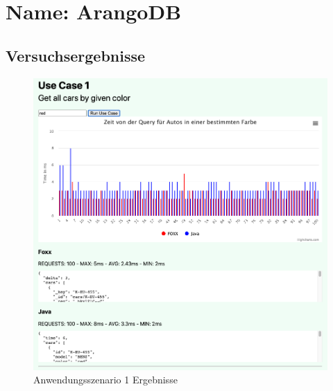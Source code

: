 \appendix
\chapter{Name: ArangoDB}
\section{Versuchsergebnisse}
\begin{figure}[htbp] 
  	\centering
     \includegraphics[width=1\textwidth]{./images/8.UseCase1.png}
 	\caption{Anwendungsszenario 1 Ergebnisse}
  \label{fig:DataSchema}
\end{figure}

